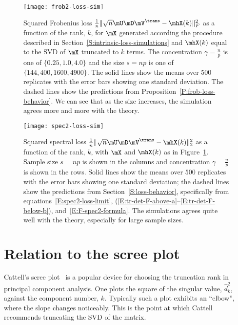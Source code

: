 \begin{figure}[tbh]
    \centering
    \texttt{[image: frob2-loss-sim]}
    \caption{
        Squared Frobenius loss
        $
            \frac{1}{n} \| \sqrt{n}\mU \mD \mV^\trans - \mhX(k) \|_F^2
        $
        as a function of the rank, $k$, for
        $\mX$ generated according the procedure described
        in Section~\ref{S:intrinsic-loss-simulations} and $\mhX(k)$ equal
        to the SVD of $\mX$ truncated to $k$ terms.  The concentration 
        $\gamma = \frac{n}{p}$ is one of $\{ 0.25, 1.0, 4.0 \}$ and the
        size $s = n p$ is one of $\{ 144, 400, 1600, 4900 \}$.  
        The solid lines show the means over $500$ replicates with the error 
        bars showing one standard deviation.  The dashed lines show the 
        predictions from Proposition~\ref{P:frob-loss-behavior}.  We can see 
        that as the size increases, the simulation agrees more and more with 
        the theory.
    }\label{F:frob2-loss-sim}
\end{figure}

\begin{figure}[hbt]
    \centering
    \texttt{[image: spec2-loss-sim]}
    \caption{
        Squared spectral loss
        $
            \frac{1}{n} \| \sqrt{n}\mU \mD \mV^\trans - \mhX(k) \|_2^2
        $
        as a function of the rank, $k$, with $\mX$ and $\mhX(k)$ as in
        Figure~\ref{F:frob2-loss-sim}.  Sample size $s = n p$ is shown in the 
        columns and concentration $\gamma = \frac{n}{p}$ is shown in the rows.
        Solid lines show the means
        over $500$ replicates with the error bars showing one standard 
        deviation; the dashed lines show the predictions from 
        Section~\ref{S:loss-behavior}, specifically from 
        equations~\eqref{E:spec2-loss-limit}, 
        (\ref{E:tr-det-F-above-a}--\ref{E:tr-det-F-below-b}), 
        and~\eqref{E:F-spec2-formula}.  The simulations agrees quite well
        with the theory, especially for large sample sizes.
    }\label{F:spec2-loss-sim}
\end{figure}

\clearpage

\section{Relation to the scree plot}\label{S:intrinsic-rank-scree-plot}

Cattell's scree plot~\cite{cattell1966scree} is a popular device for choosing
the truncation rank in principal component analysis. One plots the square of
the singular value, $\hat d^2_k$, against the component number, $k$. Typically
such a plot exhibits an ``elbow'', where the slope changes noticeably. This is
the point at which Cattell recommends truncating the SVD of the matrix.


